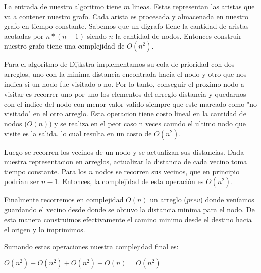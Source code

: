 La entrada de nuestro algoritmo tiene $m$ lineas. Estas representan las aristas que va a contener nuestro grafo. Cada arista es procesada y almacenada en nuestro grafo en tiempo constante. Sabemos que un digrafo tiene la cantidad de aristas acotadas por $n*(n-1)$ siendo $n$ la cantidad de nodos. Entonces construir nuestro grafo tiene una complejidad de $O(n^2)$.

Para el algoritmo de Dijkstra implementamos su cola de prioridad con dos arreglos, uno con la minima distancia encontrada hacia el nodo y otro que nos indica si un nodo fue visitado o no. Por lo tanto, conseguir el proximo nodo a visitar es recorrer uno por uno los elementos del arreglo distancia y quedarnos con el indice del nodo con menor valor valido siempre que este marcado como "no visitado" en el otro arreglo. Esta operacion tiene costo lineal en  la cantidad de nodos ($O(n)$) y se realiza en el peor caso n veces caundo el ultimo nodo que visite es la salida, lo cual resulta en un costo de $O(n^2)$. 

Luego se recorren los vecinos de un nodo y se actualizan sus distancias. Dada nuestra representacion en arreglos, actualizar la distancia de cada vecino toma tiempo constante. Para los $n$ nodos se recorren sus vecinos, que en principio podrian ser $n-1$. Entonces, la complejidad de esta operación es $O(n^2)$.

Finalmente recorremos en complejidad $O(n)$ un arreglo ($prev$) donde veníamos guardando el vecino desde donde se obtuvo la distancia minima para el nodo. De esta manera construimos efectivamente el camino minimo desde el destino hacia el origen y lo imprimimos. 

Sumando estas operaciones nuestra complejidad final es:

$O(n^2) + O(n^2) + O(n^2) + O(n) = O(n^2)$